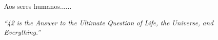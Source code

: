 
\imprimircapa

\imprimirfolhaderosto



\begin{agradecimentos}
Aos seres humanos...... 

\end{agradecimentos}


\begin{comment}
Epígrafe (Não se escreve a palavra epígrafe). Elemento opcional. 
A epígrafe deve ser colocada após o agradecimento; trata-se de uma citação, seguida de indicação de autoria, relacionada à matéria tratada no corpo do trabalho. Deve ser “[...] elaborada conforme a NBR 10520 [...]. Podem também constar epígrafes nas folhas ou páginas de abertura das seções primárias” (ABNT, 2002, p. 7). 
A fonte da epígrafe deve sempre ser mencionada nas referências. 

Citação direta até 3 linhas deve estar entre aspas e em parágrafo normal (vá até a janela de Estilo - selecione - Parágrafo), se tiver mais de 3 linhas, deve ser recuada 4 cm da margem esquerda, com fonte menor que 12 e espaçamento entre linhas simples 
\end{comment}

\begin{epigrafe}
    \vspace*{\fill}
	\begin{flushright}
		\textit{“42 is the Answer to the Ultimate Question of Life, the Universe, and Everything.”  \\
}
	\end{flushright}
\end{epigrafe}


